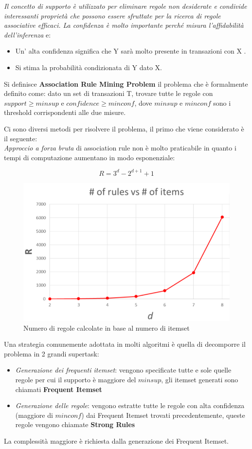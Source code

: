 \textit{Il concetto di supporto è utilizzato per eliminare regole non desiderate e condivide interessanti proprietà che possono essere sfruttate per la ricerca di regole associative efficaci.
La confidenza è molto importante perché misura l'affidabilità dell'inferenza} e:
\begin{itemize}
	\item Un' alta confidenza significa che Y sarà molto presente in transazioni con X .
	\item Si stima la probabilità condizionata di Y dato X.
\end{itemize}
\begin{defn}
Si definisce \textbf{Association Rule Mining Problem} il problema che è formalmente definito come: dato un set di transazioni T, trovare tutte le regole con $support \ge minsup$ e $confidence \ge minconf$, dove $minsup$ e $minconf$ sono i threshold corrispondenti alle due misure.
\end{defn}
Ci sono diversi metodi per risolvere il problema, il primo che viene considerato è il seguente: \\
\textit{Approccio a forza bruta} di association rule non è molto praticabile in quanto i tempi di computazione aumentano in modo esponenziale: 

\[R = 3^d - 2^{d+1} + 1\]

\begin{figure}[H]
	\centering
	\includegraphics[height=0.4 \linewidth]{association/pict/brute_force.png}
	\caption{Numero di regole calcolate in base al numero di itemset}
\end{figure}

Una strategia comunemente adottata in molti algoritmi è quella di decomporre il problema in 2 grandi supertask:
\begin{itemize}
	\item\textit{Generazione dei frequenti itemset}: vengono specificate tutte e sole quelle regole per cui il supporto è maggiore del $minsup$, gli itemset generati sono chiamati \textbf{Frequent Itemset}
	\item \textit{Generazione delle regole}: vengono estratte tutte le regole con alta confidenza (maggiore di $minconf$) dai Frequent Itemset trovati precedentemente, queste regole vengono chiamate \textbf{Strong Rules}
\end{itemize}
La complessità maggiore è richiesta dalla generazione dei Frequent Itemset.


